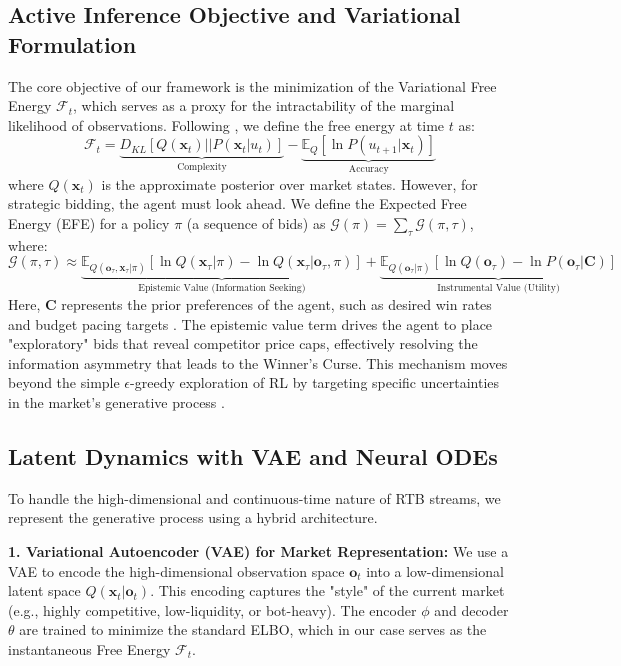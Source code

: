 \subsection{Active Inference Objective and Variational Formulation}
The core objective of our framework is the minimization of the Variational Free Energy $\mathcal{F}_t$, which serves as a proxy for the intractability of the marginal likelihood of observations. Following \cite{ref_new_TheMissingRewar}, we define the free energy at time $t$ as:
\begin{equation}
    \mathcal{F}_t = \underbrace{D_{KL}[Q(\mathbf{x}_t) || P(\mathbf{x}_t | u_t)]}_{\text{Complexity}} - \underbrace{\mathbb{E}_{Q}[\ln P(u_{t+1} | \mathbf{x}_t)]}_{\text{Accuracy}}
    \label{eq:vfe}
\end{equation}
where $Q(\mathbf{x}_t)$ is the approximate posterior over market states. However, for strategic bidding, the agent must look ahead. We define the Expected Free Energy (EFE) for a policy $\pi$ (a sequence of bids) as $\mathcal{G}(\pi) = \sum_\tau \mathcal{G}(\pi, \tau)$, where:
\begin{equation}
    \mathcal{G}(\pi, \tau) \approx \underbrace{\mathbb{E}_{Q(\mathbf{o}_\tau, \mathbf{x}_\tau | \pi)} [\ln Q(\mathbf{x}_\tau | \pi) - \ln Q(\mathbf{x}_\tau | \mathbf{o}_\tau, \pi)]}_{\text{Epistemic Value (Information Seeking)}} + \underbrace{\mathbb{E}_{Q(\mathbf{o}_\tau | \pi)} [\ln Q(\mathbf{o}_\tau) - \ln P(\mathbf{o}_\tau | \mathbf{C})]}_{\text{Instrumental Value (Utility)}}
\end{equation}
Here, $\mathbf{C}$ represents the prior preferences of the agent, such as desired win rates and budget pacing targets \cite{ref_new_AFieldGuideforP}. The epistemic value term drives the agent to place "exploratory" bids that reveal competitor price caps, effectively resolving the information asymmetry that leads to the Winner's Curse. This mechanism moves beyond the simple $\epsilon$-greedy exploration of RL by targeting specific uncertainties in the market's generative process \cite{ref_new_ActiveInference}.

\subsection{Latent Dynamics with VAE and Neural ODEs}
To handle the high-dimensional and continuous-time nature of RTB streams, we represent the generative process using a hybrid architecture. 

\textbf{1. Variational Autoencoder (VAE) for Market Representation:}
We use a VAE to encode the high-dimensional observation space $\mathbf{o}_t$ into a low-dimensional latent space $Q(\mathbf{x}_t | \mathbf{o}_t)$. This encoding captures the "style" of the current market (e.g., highly competitive, low-liquidity, or bot-heavy). The encoder $\phi$ and decoder $\theta$ are trained to minimize the standard ELBO, which in our case serves as the instantaneous Free Energy $\mathcal{F}_t$.

